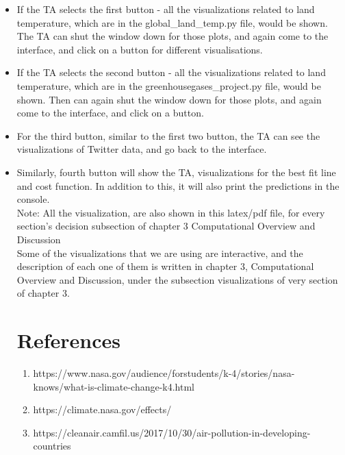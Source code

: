 \documentclass[a4paper, 11pt]{report}
\begin{document}
\begin{itemize}
    \item If the TA selects the first button - all the visualizations related to land temperature, which are in the global\_land\_temp.py file, would be shown. The TA can shut the window down for those plots, and again come to the interface, and click on a button for different visualisations. \\

    \item If the TA selects the second button - all the visualizations related to land temperature, which are in the greenhousegases\_project.py file, would be shown. Then can again shut the window down for those plots, and again come to the interface, and click on a button. \\

    \item For the third button, similar to the first two button, the TA can see the visualizations of Twitter data, and go back to the interface. \\

    \item Similarly, fourth button will show the TA, visualizations for the best fit line and cost function. In addition to this, it will also print the predictions in the console. \\

    Note: All the visualization, are also shown in this latex/pdf file, for every section's decision subsection of chapter 3 Computational Overview and Discussion\\

    Some of the visualizations that we are using are interactive, and the description of each one of them is written in chapter 3, Computational Overview and Discussion, under the subsection visualizations of very section of chapter 3.

\newpage

\chapter{References}
\scriptsize
\begin{enumerate}
    \item https://www.nasa.gov/audience/forstudents/k-4/stories/nasa-knows/what-is-climate-change-k4.html

    \item https://climate.nasa.gov/effects/

    \item https://cleanair.camfil.us/2017/10/30/air-pollution-in-developing-countries


\end{enumerate}
\end{itemize}
\end{document}
